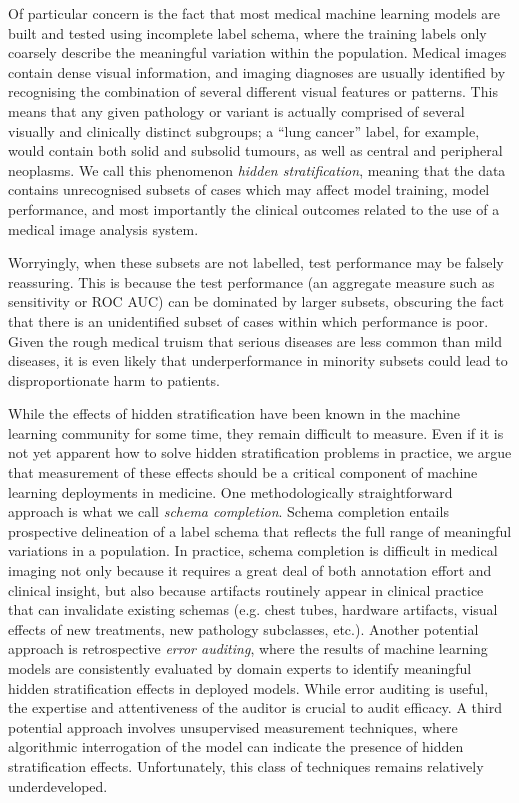 \documentclass{article}
\begin{document}
Of particular concern is the fact that most medical machine learning models are built and tested using incomplete label schema, where the training labels only coarsely describe the meaningful variation within the population. 
Medical images contain dense visual information, and imaging diagnoses are usually identified by recognising the combination of several different visual features or patterns. 
This means that any given pathology or variant is actually comprised of several visually and clinically distinct subgroups; a ``lung cancer'' label, for example, would contain both solid and subsolid tumours, as well as central and peripheral neoplasms. 
We call this phenomenon \textit{hidden stratification}, meaning that the data contains unrecognised subsets of cases which may affect model training, model performance, and most importantly the clinical outcomes related to the use of a medical image analysis system.  

Worryingly, when these subsets are not labelled, test performance may be falsely reassuring. 
This is because the test performance (an aggregate measure such as sensitivity or ROC AUC) can be dominated by larger subsets, obscuring the fact that there is an unidentified subset of cases within which performance is poor. 
Given the rough medical truism that serious diseases are less common than mild diseases, it is even likely that underperformance in minority subsets could lead to disproportionate harm to patients.

While the effects of hidden stratification have been known in the machine learning community for some time, they remain difficult to measure. 
 Even if it is not yet apparent how to solve hidden stratification problems in practice, we argue that measurement of these effects should be a critical component of machine learning deployments in medicine.  
 One methodologically straightforward approach is what we call \textit{schema completion}.  
 Schema completion entails prospective delineation of a label schema that reflects the full range of meaningful variations in a population.  
 In practice, schema completion is difficult in medical imaging not only because it requires a great deal of both annotation effort and clinical insight, but also because artifacts routinely appear in clinical practice that can invalidate existing schemas (e.g. chest tubes, hardware artifacts, visual effects of new treatments, new pathology subclasses, etc.).  
 Another potential approach is retrospective \textit{error auditing}, where the results of machine learning models are consistently evaluated by domain experts to identify meaningful hidden stratification effects in deployed models.  
 While error auditing is useful, the expertise and attentiveness of the auditor is crucial to audit efficacy.  
 A third potential approach involves unsupervised measurement techniques, where algorithmic interrogation of the model can indicate the presence of hidden stratification effects.  Unfortunately, this class of techniques remains relatively underdeveloped.
\end{document}
